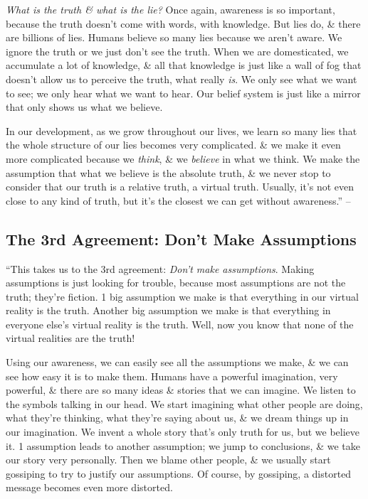 \documentclass{article}
\numberwithin{equation}{section}
\begin{document}
\textit{What is the truth \& what is the lie?} Once again, awareness is so important, because the truth doesn't come with words, with knowledge. But lies do, \& there are billions of lies. Humans believe so many lies because we aren't aware. We ignore the truth or we just don't see the truth. When we are domesticated, we accumulate a lot of knowledge, \& all that knowledge is just like a wall of fog that doesn't allow us to perceive the truth, what really \textit{is}. We only see what we want to see; we only hear what we want to hear. Our belief system is just like a mirror that only shows us what we believe.

In our development, as we grow throughout our lives, we learn so many lies that the whole structure of our lies becomes very complicated. \& we make it even more complicated because we \textit{think}, \& we \textit{believe} in what we think. We make the assumption that what we believe is the absolute truth, \& we never stop to consider that our truth is a relative truth, a virtual truth. Usually, it's not even close to any kind of truth, but it's the closest we can get without awareness.'' -- \cite[pp. 52--55]{Ruiz_Ruiz2011}

\subsection{The 3rd Agreement: Don't Make Assumptions}
``This takes us to the 3rd agreement: \textit{Don't make assumptions}. Making assumptions is just looking for trouble, because most assumptions are not the truth; they're fiction. 1 big assumption we make is that everything in our virtual reality is the truth. Another big assumption we make is that everything in everyone else's virtual reality is the truth. Well, now you know that none of the virtual realities are the truth!

Using our awareness, we can easily see all the assumptions we make, \& we can see how easy it is to make them. Humans have a powerful imagination, very powerful, \& there are so many ideas \& stories that we can imagine. We listen to the symbols talking in our head. We start imagining what other people are doing, what they're thinking, what they're saying about us, \& we dream things up in our imagination. We invent a whole story that's only truth for us, but we believe it. 1 assumption leads to another assumption; we jump to conclusions, \& we take our story very personally. Then we blame other people, \& we usually start gossiping to try to justify our assumptions. Of course, by gossiping, a distorted message becomes even more distorted.
\end{document}
